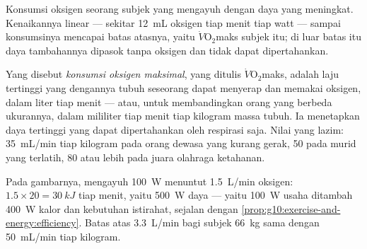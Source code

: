 \begin{omfigure}

{\small Konsumsi oksigen seorang subjek yang mengayuh dengan daya yang
meningkat. Kenaikannya linear --- sekitar \qty{12}{mL} oksigen tiap
menit tiap watt --- sampai konsumsinya mencapai batas atasnya, yaitu
$\dot V\!\mathrm{O_2}$maks subjek itu; di luar batas itu daya
tambahannya dipasok tanpa oksigen dan tidak dapat dipertahankan.}
\end{omfigure}

\begin{definition}\label{def:g10:exercise-and-energy:vo2max}
Yang disebut \emph{konsumsi oksigen maksimal}, yang ditulis $\dot V\!\mathrm{O_2}$maks, adalah laju
tertinggi yang dengannya tubuh seseorang dapat menyerap dan memakai
oksigen, dalam liter tiap menit --- atau, untuk membandingkan orang
yang berbeda ukurannya, dalam mililiter tiap menit tiap kilogram massa
tubuh. Ia menetapkan daya tertinggi yang dapat dipertahankan oleh
respirasi saja. Nilai yang lazim: \qty{35}{mL/min} tiap kilogram pada
orang dewasa yang kurang gerak, \num{50} pada murid yang terlatih,
\num{80} atau lebih pada juara olahraga ketahanan.
\end{definition}

\begin{example}\label{ex:g10:exercise-and-energy:reading}
Pada gambarnya, mengayuh \qty{100}{W} menuntut \qty{1.5}{L/min}
oksigen: $1.5 \times 20 = \qty{30}{kJ}$ tiap menit, yaitu \qty{500}{W}
daya  --- yaitu \qty{100}{W} usaha ditambah \qty{400}{W}
kalor dan kebutuhan istirahat, sejalan dengan
\cref{prop:g10:exercise-and-energy:efficiency}. Batas atas
\qty{3.3}{L/min} bagi subjek \qty{66}{kg} sama dengan \qty{50}{mL/min}
tiap kilogram.
\end{example}

